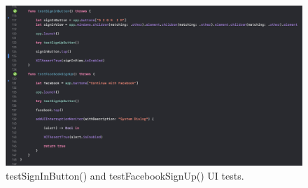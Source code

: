 \begin{figure}[H]
    \centering
    \includegraphics[width=\textwidth]{./graphics/testing/testing4.png}
    \caption{testSignInButton() and testFacebookSignUp() UI tests.}
    \label{fig:testing4}
\end{figure}